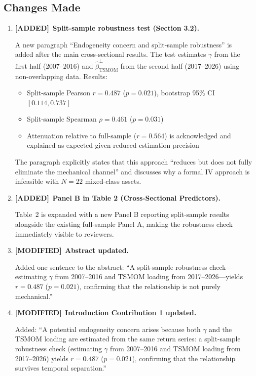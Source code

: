 \documentclass[12pt,a4paper]{article}
\newcommand{\ADDED}{\textcolor{added}{\textbf{[ADDED]}}}
\newcommand{\MODIFIED}{\textcolor{modified}{\textbf{[MODIFIED]}}}
\begin{document}
\subsection{Changes Made}

\begin{enumerate}[label=\arabic*.]

\item \ADDED\ \textbf{Split-sample robustness test (Section 3.2).}

A new paragraph ``Endogeneity concern and split-sample robustness'' is added after the main cross-sectional results. The test estimates $\gamma$ from the first half (2007--2016) and $\hat{\beta}_{\text{TSMOM}}^{\perp}$ from the second half (2017--2026) using non-overlapping data. Results:
\begin{itemize}
\item Split-sample Pearson $r = 0.487$ ($p = 0.021$), bootstrap 95\% CI $[0.114, 0.737]$
\item Split-sample Spearman $\rho = 0.461$ ($p = 0.031$)
\item Attenuation relative to full-sample ($r = 0.564$) is acknowledged and explained as expected given reduced estimation precision
\end{itemize}

The paragraph explicitly states that this approach ``reduces but does not fully eliminate the mechanical channel'' and discusses why a formal IV approach is infeasible with $N = 22$ mixed-class assets.

\item \ADDED\ \textbf{Panel B in Table 2 (Cross-Sectional Predictors).}

Table~2 is expanded with a new Panel B reporting split-sample results alongside the existing full-sample Panel A, making the robustness check immediately visible to reviewers.

\item \MODIFIED\ \textbf{Abstract updated.}

Added one sentence to the abstract: ``A split-sample robustness check---estimating $\gamma$ from 2007--2016 and TSMOM loading from 2017--2026---yields $r = 0.487$ ($p = 0.021$), confirming that the relationship is not purely mechanical.''

\item \MODIFIED\ \textbf{Introduction Contribution 1 updated.}

Added: ``A potential endogeneity concern arises because both $\gamma$ and the TSMOM loading are estimated from the same return series: a split-sample robustness check (estimating $\gamma$ from 2007--2016 and TSMOM loading from 2017--2026) yields $r = 0.487$ ($p = 0.021$), confirming that the relationship survives temporal separation.''


\end{enumerate}
\end{document}
